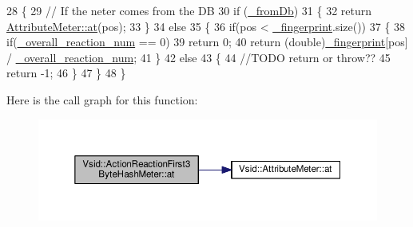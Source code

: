 \begin{DoxyCode}
28 \{
29     \textcolor{comment}{// If the neter comes from the DB}
30     \textcolor{keywordflow}{if} (\hyperlink{class_vsid_1_1_attribute_meter_a2ce3946fc699d3c375ee4019a9e3c022}{\_fromDb})
31     \{
32         \textcolor{keywordflow}{return} \hyperlink{class_vsid_1_1_attribute_meter_a3b067be638ae613a732fa090c07c5e71}{AttributeMeter::at}(pos);
33     \}
34     \textcolor{keywordflow}{else}
35     \{
36         \textcolor{keywordflow}{if}(pos < \hyperlink{class_vsid_1_1_attribute_meter_a0386b2fe9c5d6ab6fba16029d8da4efe}{\_fingerprint}.size())
37         \{
38             \textcolor{keywordflow}{if}(\hyperlink{class_vsid_1_1_action_reaction_first3_byte_hash_meter_a396a0b8f344ca80365ddbca7d4e07889}{\_overall\_reaction\_num} == 0)
39                 \textcolor{keywordflow}{return} 0;
40             \textcolor{keywordflow}{return} (\textcolor{keywordtype}{double})\hyperlink{class_vsid_1_1_attribute_meter_a0386b2fe9c5d6ab6fba16029d8da4efe}{\_fingerprint}[pos] / \hyperlink{class_vsid_1_1_action_reaction_first3_byte_hash_meter_a396a0b8f344ca80365ddbca7d4e07889}{\_overall\_reaction\_num};
41         \}
42         \textcolor{keywordflow}{else}
43         \{
44             \textcolor{comment}{//TODO return or throw??}
45             \textcolor{keywordflow}{return} -1;
46         \}
47     \}
48 \}
\end{DoxyCode}


Here is the call graph for this function\-:
\nopagebreak
\begin{figure}[H]
\begin{center}
\leavevmode
\includegraphics[width=350pt]{class_vsid_1_1_action_reaction_first3_byte_hash_meter_ad66c1871306c2151b31518e167425697_cgraph}
\end{center}
\end{figure}


